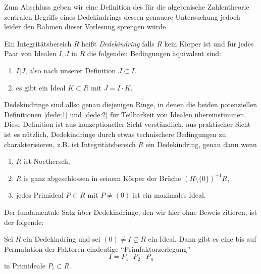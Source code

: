 \documentclass{book}
\begin{document}
Zum Abschluss geben wir eine Definition des für die algebraische Zahlentheorie
zentralen Begriffs eines Dedekindrings dessen genauere Untersuchung jedoch
leider den Rahmen dieser Vorlesung sprengen würde.

\begin{defi}
    \label{defi:dedekind}
    Ein Integritätsbereich $R$ heißt \emph{Dedekindring} falls $R$ kein Körper
    ist und für jedes Paar von Idealen $I,J$ in $R$ die folgenden Bedingungen
    äquivalent sind:
    \begin{enumerate}[label=(\roman *)]
        \item\label{dede:1} $I | J$, also nach unserer Definition $J \subset I$.
        \item\label{dede:2} es gibt ein Ideal $K \subset R$ mit $J = I \cdot K$.  
    \end{enumerate}
\end{defi}

\begin{rem}
    \label{rem:dedekind} Dedekindringe sind allso genau diejenigen Ringe, in
    denen die beiden potenziellen Definitionen \eqref{dede:1} und
    \eqref{dede:2} für Teilbarkeit von Idealen übereinstimmen.
    Diese Definition ist aus konzeptioneller Sicht verständlich, aus
    praktischer Sicht ist es nützlich, Dedekindringe durch etwas technischere
    Bedingungen zu charakterisieren, z.B. ist Integritätsbereich $R$ ein Dedekindring,
    genau dann wenn
    \begin{enumerate}
        \item $R$ ist Noethersch,
        \item $R$ is ganz abgeschlossen in seinem Körper der Brüche $(R \setminus \{0\})^{-1}R$,
        \item jedes Primideal $P \subset R$ mit $P \ne (0)$ ist ein maximales Ideal.
    \end{enumerate}
\end{rem}

Der fundamentale Satz über Dedekindringe, den wir hier ohne Beweis zitieren, ist der folgende: 

\begin{thm}
    \label{thm:dedekindfaktorisierung}
    Sei $R$ ein Dedekindring und sei $(0) \ne I \subsetneq R$ ein Ideal. Dann
    gibt es eine bis auf Permutation der Faktoren eindeutige
    ``Primfaktorzerlegung''
    \[
        I = P_1 \cdot P_2 \cdots P_n
    \]
    in Primideale $P_i \subset R$.
\end{thm}
\end{document}
